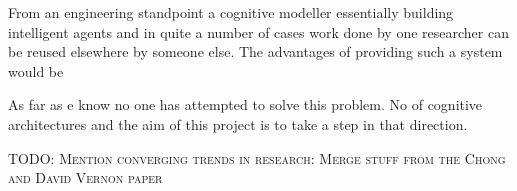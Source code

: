 \begin{itemize}


\end{itemize}



From an engineering standpoint a cognitive modeller essentially
building intelligent agents and in quite a number of cases work done
by one researcher can be reused elsewhere by someone else. The
advantages of providing such a system would be


As far as e know no one has attempted to solve this problem. No of
cognitive architectures and the aim of this project is to take a step
in that direction.


\textsc{TODO: Mention converging trends in research: Merge stuff from
  the Chong and David Vernon paper}